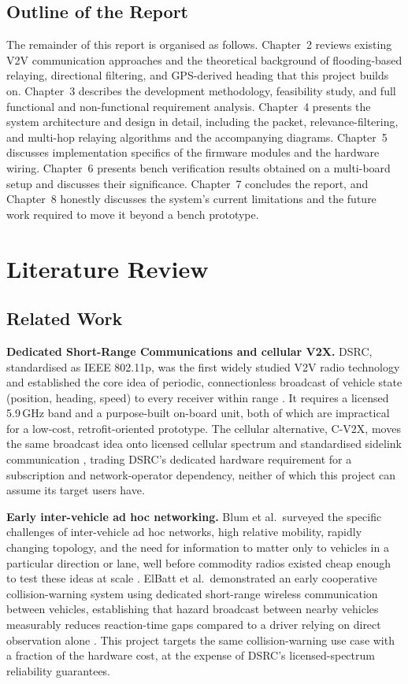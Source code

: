 \documentclass[12pt,a4paper]{report}
\begin{document}
\section{Outline of the Report}
The remainder of this report is organised as follows. Chapter~2 reviews existing V2V communication approaches and the theoretical background of flooding-based relaying, directional filtering, and GPS-derived heading that this project builds on. Chapter~3 describes the development methodology, feasibility study, and full functional and non-functional requirement analysis. Chapter~4 presents the system architecture and design in detail, including the packet, relevance-filtering, and multi-hop relaying algorithms and the accompanying diagrams. Chapter~5 discusses implementation specifics of the firmware modules and the hardware wiring. Chapter~6 presents bench verification results obtained on a multi-board setup and discusses their significance. Chapter~7 concludes the report, and Chapter~8 honestly discusses the system's current limitations and the future work required to move it beyond a bench prototype.

\chapter{Literature Review}

\section{Related Work}
\textbf{Dedicated Short-Range Communications and cellular V2X.} DSRC, standardised as IEEE 802.11p, was the first widely studied V2V radio technology and established the core idea of periodic, connectionless broadcast of vehicle state (position, heading, speed) to every receiver within range \cite{kenney2011dsrc}. It requires a licensed 5.9\,GHz band and a purpose-built on-board unit, both of which are impractical for a low-cost, retrofit-oriented prototype. The cellular alternative, C-V2X, moves the same broadcast idea onto licensed cellular spectrum and standardised sidelink communication \cite{3gpp22885}, trading DSRC's dedicated hardware requirement for a subscription and network-operator dependency, neither of which this project can assume its target users have.

\textbf{Early inter-vehicle ad hoc networking.} Blum et al.\ surveyed the specific challenges of inter-vehicle ad hoc networks, high relative mobility, rapidly changing topology, and the need for information to matter only to vehicles in a particular direction or lane, well before commodity radios existed cheap enough to test these ideas at scale \cite{blum2004challenges}. ElBatt et al.\ demonstrated an early cooperative collision-warning system using dedicated short-range wireless communication between vehicles, establishing that hazard broadcast between nearby vehicles measurably reduces reaction-time gaps compared to a driver relying on direct observation alone \cite{elbatt2006cooperative}. This project targets the same collision-warning use case with a fraction of the hardware cost, at the expense of DSRC's licensed-spectrum reliability guarantees.
\end{document}
